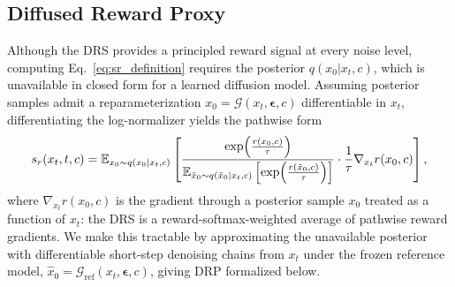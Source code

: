\subsection{Diffused Reward Proxy}
\label{sec:drp}
Although the DRS provides a principled reward signal at every noise level, computing Eq.~\eqref{eq:sr_definition} requires the posterior $q(x_0|x_t,c)$, which is unavailable in closed form for a learned diffusion model. Assuming posterior samples admit a reparameterization $x_0 = \mathcal{G}(x_t,\boldsymbol{\epsilon},c)$ differentiable in $x_t$, differentiating the log-normalizer yields the pathwise form
\begin{equation}
\begin{aligned}
s_r(x_t,t,c)
=
\mathbb{E}_{x_0\sim q(x_0|x_t,c)}
\left[
\frac{\exp\!\left(\frac{r(x_0,c)}{\tau}\right)}
{\mathbb{E}_{\tilde{x}_0\sim q(\tilde{x}_0|x_t,c)}
\left[\exp\!\left(\frac{r(\tilde{x}_0,c)}{\tau}\right)\right]}
\cdot
\frac{1}{\tau}\nabla_{x_t}r(x_0,c)
\right],
\end{aligned}
\label{eq:drs_pathwise}
\end{equation}
where $\nabla_{x_t}r(x_0,c)$ is the gradient through a posterior sample $x_0$ treated as a function of $x_t$: the DRS is a reward-softmax-weighted average of pathwise reward gradients. We make this tractable by approximating the unavailable posterior with differentiable short-step denoising chains from $x_t$ under the frozen reference model, $\hat{x}_0 = \mathcal{G}_{\mathrm{ref}}(x_t,\boldsymbol{\epsilon},c)$, giving DRP formalized below.


